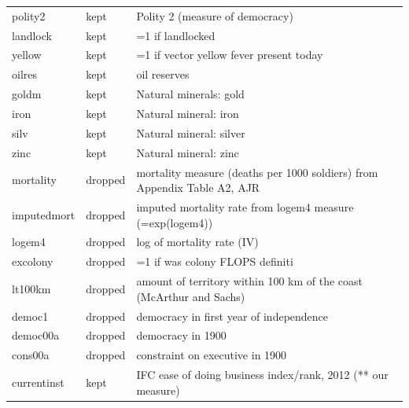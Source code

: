\begin{tabular}{lll}
 polity2                        & kept     & Polity 2 (measure of democracy)                                          \\
 landlock                       & kept     & =1 if landlocked                                                         \\
 yellow                         & kept     & =1 if vector yellow fever present today                                  \\
 oilres                         & kept     & oil reserves                                                             \\
 goldm                          & kept     & Natural minerals: gold                                                   \\
 iron                           & kept     & Natural mineral: iron                                                    \\
 silv                           & kept     & Natural mineral: silver                                                  \\
 zinc                           & kept     & Natural mineral: zinc                                                    \\
 mortality                      & dropped  & mortality measure (deaths per 1000 soldiers) from Appendix Table A2, AJR \\
 imputedmort                    & dropped  & imputed mortality rate from logem4 measure (=exp(logem4))                \\
 logem4                         & dropped  & log of mortality rate (IV)                                               \\
 excolony                       & dropped  & =1 if was colony FLOPS definiti                                          \\
 lt100km                        & dropped  & amount of territory within 100 km of the coast (McArthur and Sachs)      \\
 democ1                         & dropped  & democracy in first year of independence                                  \\
 democ00a                       & dropped  & democracy in 1900                                                        \\
 cons00a                        & dropped  & constraint on executive in 1900                                          \\
 currentinst                    & kept     & IFC ease of doing business index/rank, 2012 (** our measure)             \\

\end{tabular}
